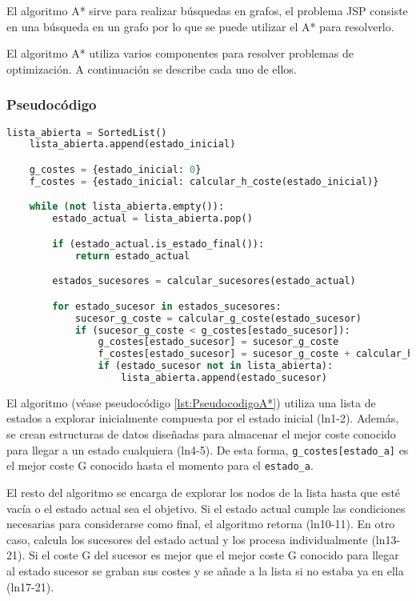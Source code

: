 \begin{keynotebox}
    El algoritmo A* sirve para realizar búsquedas en grafos,
    el problema JSP consiste en una búsqueda en un grafo
    por lo que se puede utilizar el A* para resolverlo.
\end{keynotebox}

El algoritmo A* utiliza varios componentes para resolver problemas
de optimización. A continuación se describe cada uno de ellos.

\subsubsection{Pseudocódigo}

\begin{lstlisting}[language=Python, caption=Pseudocódigo del algoritmo A*, label=lst:PseudocodigoA*]
    lista_abierta = SortedList()
    lista_abierta.append(estado_inicial)

    g_costes = {estado_inicial: 0}
    f_costes = {estado_inicial: calcular_h_coste(estado_inicial)}

    while (not lista_abierta.empty()):
        estado_actual = lista_abierta.pop()

        if (estado_actual.is_estado_final()):
            return estado_actual

        estados_sucesores = calcular_sucesores(estado_actual)

        for estado_sucesor in estados_sucesores:
            sucesor_g_coste = calcular_g_coste(estado_sucesor)
            if (sucesor_g_coste < g_costes[estado_sucesor]):
                g_costes[estado_sucesor] = sucesor_g_coste
                f_costes[estado_sucesor] = sucesor_g_coste + calcular_h_coste(estado_sucesor)
                if (estado_sucesor not in lista_abierta):
                    lista_abierta.append(estado_sucesor)
\end{lstlisting}

El algoritmo (véase pseudocódigo \ref{lst:PseudocodigoA*}) utiliza una lista de estados a explorar
inicialmente compuesta por el estado inicial (ln1-2).
Además, se crean estructuras de datos diseñadas para almacenar
el mejor coste conocido para llegar a un estado cualquiera (ln4-5).
De esta forma, \lstinline{g_costes[estado_a]} es el mejor coste G
conocido hasta el momento para el \lstinline{estado_a}.

El resto del algoritmo se encarga de explorar los nodos
de la lista hasta que esté vacía o el estado actual sea el objetivo.
Si el estado actual cumple las condiciones necesarias
para considerarse como final, el algoritmo retorna (ln10-11).
En otro caso, calcula los sucesores del estado actual
y los procesa individualmente (ln13-21).
Si el coste G del sucesor es mejor que el mejor coste G
conocido para llegar al estado sucesor
se graban sus costes y se añade a la lista
si no estaba ya en ella (ln17-21).

